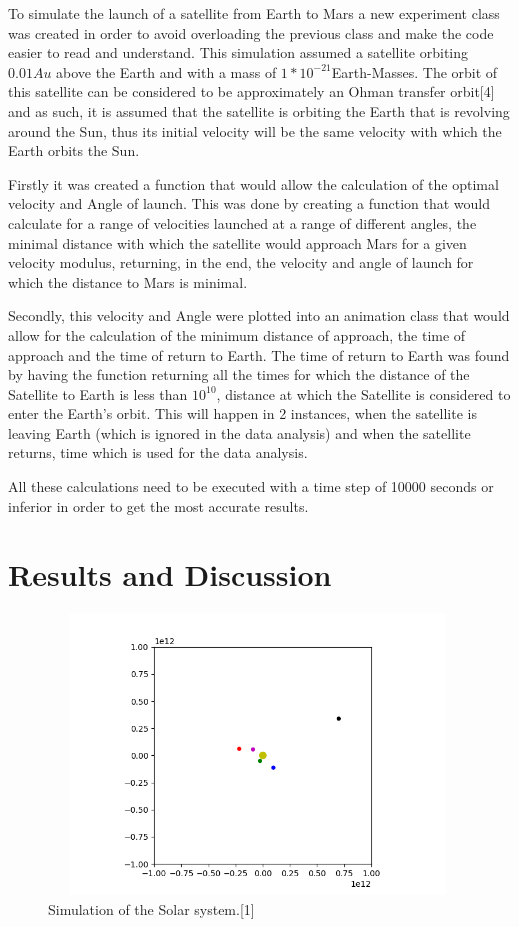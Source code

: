 \documentclass{article}
\begin{document}
{To simulate the launch of a satellite from Earth to Mars a new experiment class was created in order to avoid overloading the previous class and make the code easier to read and understand.} {This simulation assumed a satellite orbiting $0.01Au$ above the Earth and with a mass of $1*10^{-21}$Earth-Masses. The orbit of this satellite can be considered to be approximately an Ohman transfer orbit[4] and as such, it is assumed that the satellite is orbiting the Earth that is revolving around the Sun, thus its initial velocity will be the same velocity with which the Earth orbits the Sun.}


{Firstly it was created a function that would allow the calculation of the optimal velocity and Angle of launch. This was done by creating a function that would calculate for a range of velocities launched at a range of different angles, the minimal distance with which the satellite would approach Mars for a given velocity modulus, returning, in the end, the velocity and angle of launch for which the distance to Mars is minimal.}

{Secondly, this velocity and Angle were plotted into an animation class that would allow for the calculation of the minimum distance of approach, the time of approach and the time of return to Earth. The time of return to Earth was found by having the function returning all the times for which the distance of the Satellite to Earth is less than $10^10$, distance at which the Satellite is considered to enter the Earth's orbit. This will happen in 2 instances, when the satellite is leaving Earth (which is ignored in the data analysis) and when the satellite returns, time which is used for the data analysis. }

{All these calculations need to be executed with a time step of 10000 seconds or inferior in order to get the most accurate results.}

\section{Results and Discussion}

\begin{figure}[H]
    \centering
    \includegraphics[width=11.115cm, height=7.455cm]{Solar Animation.png}
    \caption{Simulation of the Solar system.[1]}
    \label{fig:my_label}
\end{figure}
\end{document}
